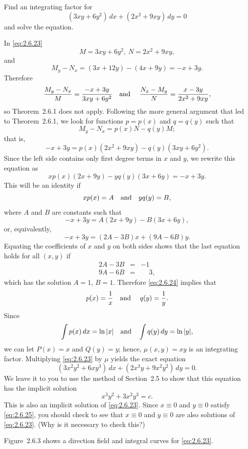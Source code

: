 \setcounter{example}{2}
\setcounter{equation}{22}
\begin{example}
  \label{example:2.6.3} \rm Find an integrating factor for
  \begin{equation}
    \label{eq:2.6.23}(3xy+6y^{2})\,dx+(2x^{2}+9xy)\,dy=0
  \end{equation}
  and solve the equation.
\end{example}
\setcounter{equation}{23}
\begin{examplesolution}
\solution In \eqref{eq:2.6.23}
\[
  M=3xy+6y^{2},\ N=2x^{2}+9xy,
\]
and
\[
  M_{y}-N_{x}=(3x+12y)-(4x+9y)=-x+3y.
\]
Therefore
\[
  \frac{M_{y}-N_{x}}{M}=\frac{-x+3y}{3xy+6y^{2}}\mbox{\quad and \quad}{\frac{N_{x}-M_{y}}{N}}=\frac{x-3y}{2x^{2}+9xy},
\]
so Theorem~2.6.1 does not apply. Following the more general argument that led to
Theorem~2.6.1, we look for functions $p=p(x)$ and $q=q(y)$ such that
\[
  M_{y}-N_{x}=p(x)N-q(y)M;
\]
that is,
\[
  -x+3y=p(x)(2x^{2}+9xy)-q(y)(3xy+6y^{2}).
\]
Since the left side contains only first degree terms in $x$ and $y$, we rewrite this equation as
\[
  xp(x)(2x+9y)-yq(y)(3x+6y)=-x+3y.
\]
This will be an identity if
\begin{equation}
  \label{eq:2.6.24}xp(x)=A\mbox{\quad and\quad}yq(y)=B,
\end{equation}
where $A$ and $B$ are constants such that
\[
  -x+3y=A(2x+9y)-B(3x+6y),
\]
or, equivalently,
\[
  -x+3y=(2A-3B)x+(9A-6B)y.
\]
Equating the coefficients of $x$ and $y$ on both sides shows that the last equation holds for all
$(x,y)$ if
\begin{eqnarray*}
  2A-3B & = & -1 \\
  9A-6B & = & \phantom{-}3,
\end{eqnarray*}
which has the solution $A=1$, $B=1$. Therefore \eqref{eq:2.6.24} implies that
\[
  p(x)=\frac{1}{x}\mbox{\quad and \quad}q(y)=\frac{1}{y}.
\]
Since
\[
  \int p(x)\,dx=\ln|x|\mbox{\quad and\quad}\int q(y)\,dy=\ln|y|,
\]
we can let $P(x)=x$ and $Q(y)=y$; hence, $\mu(x,y)=xy$ is an integrating factor. Multiplying
\eqref{eq:2.6.23} by $\mu$ yields the exact equation
\[
  (3x^{2}y^{2}+6xy^{3})\,dx+(2x^{3}y+9x^{2}y^{2})\,dy=0.
\]
We leave it to you to use the method of Section~2.5 to show that this equation has the implicit
solution
\begin{equation}
  \label{eq:2.6.25}x^{3}y^{2}+3x^{2}y^{3}=c.
\end{equation}
This is also an implicit solution of \eqref{eq:2.6.23}. Since $x\equiv0$ and $y\equiv0$ satisfy
\eqref{eq:2.6.25}, you should check to see that $x\equiv0$ and $y\equiv0$ are also solutions of
\eqref{eq:2.6.23}. (Why is it necessary to check this?)

Figure~2.6.3 shows a direction field and integral curves for \eqref{eq:2.6.23}.
\end{examplesolution}

